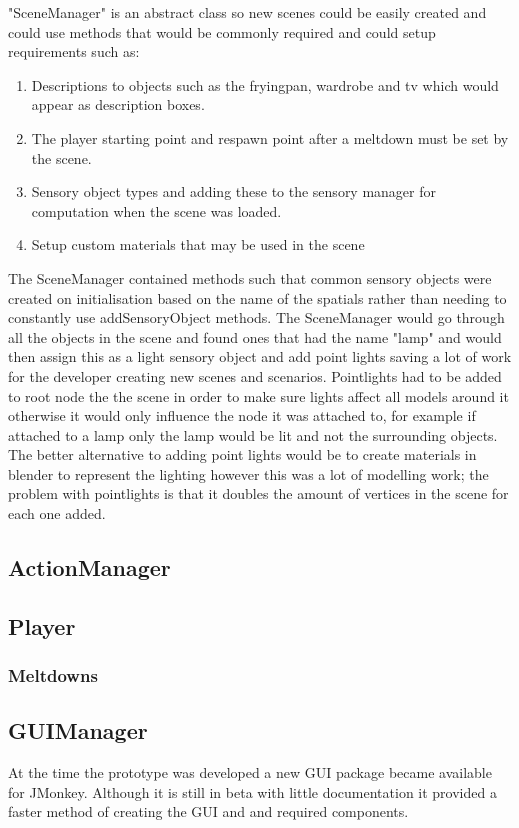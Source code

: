 "SceneManager" is an abstract class so new scenes could be easily created and could use methods that would be commonly required and could setup requirements such as:

\begin{enumerate}
\item Descriptions to objects such as the fryingpan, wardrobe and tv which would appear as description boxes. 
\item The player starting point and respawn point after a meltdown must be set by the scene. 
\item Sensory object types and adding these to the sensory manager for computation when the scene was loaded. 
\item Setup custom materials that may be used in the scene
\end{enumerate}

The SceneManager contained methods such that common sensory objects were created on initialisation based on the name of the spatials rather than needing to constantly use addSensoryObject methods. The SceneManager would go through all the objects in the scene and found ones that had the name "lamp" and would then assign this as a light sensory object and add point lights saving a lot of work for the developer creating new scenes and scenarios. Pointlights had to be added to root node the the scene in order to make sure lights affect all models around it otherwise it would only influence the node it was attached to, for example if attached to a lamp only the lamp would be lit and not the surrounding objects. The better alternative to adding point lights would be to create materials in blender to represent the lighting however this was a lot of modelling work; the problem with pointlights is that it doubles the amount of vertices in the scene for each one added.


\subsection{ActionManager}


\subsection{Player}
\subsubsection{Meltdowns}

\subsection{GUIManager}
At the time the prototype was developed a new GUI package became available for JMonkey. Although it is still in beta with little documentation it provided a faster method of creating the GUI and and required components. 

